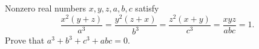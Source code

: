 Nonzero real numbers $x,y,z,a,b,c$ satisfy
\[\dfrac{x^2(y+z)}{a^3}=\dfrac{y^2(z+x)}{b^3}=\dfrac{z^2(x+y)}{c^3}=\dfrac{xyz}{abc}=1.\]
Prove that $a^3+b^3+c^3+abc=0$.
